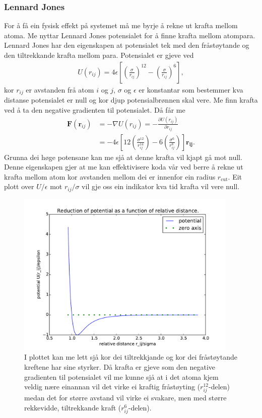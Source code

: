 \documentclass[12pt, a4paper]{article}
\theoremstyle{definition} \newtheorem*{definition}{Teorem}
\newcommand{\vb}{\mathbf}
\begin{document}
        \subsubsection*{Lennard Jones}
            For å få ein fysisk effekt på systemet må me byrje å rekne ut krafta mellom atoma. Me nyttar Lennard Jones potensialet for å finne krafta mellom atompara.
            Lennard Jones har den eigenskapen at potensialet tek med den fråstøytande og den tiltrekkande krafta mellom para. Potensialet er gjeve ved
            \begin{align*}
                U(r_{ij}) = 4\epsilon\left[ \left( \frac{\sigma}{r_{ij}} \right)^{12} - \left( \frac{\sigma}{r_{ij}} \right)^{6} \right],
            \end{align*}
            kor $r_{ij}$ er avstanden frå atom $i$ og $j$, $\sigma$ og $\epsilon$ er konstantar som bestemmer kva distanse potensialet er null og kor djup potensialbrønnen skal vere.
            Me finn krafta ved å ta den negative gradienten til potensialet. Då får me
            \begin{align*}
                \vb{F}(\vb{r}_{ij}) &= -\nabla U(r_{ij}) = -\frac{\partial U(r_{ij})}{\partial r_{ij}} \\
                &= -4\epsilon\left[ 12\left( \frac{\sigma^{12}}{r_{ij}^{14}} \right) - 6\left( \frac{\sigma^6}{r_{ij}^8} \right) \right]\vb{r_{ij}}.
            \end{align*}
            Grunna dei høge potensane kan me sjå at denne krafta vil kjapt gå mot null. Denne eigenskapen gjer at me kan effektivisere koda vår ved berre å rekne ut krafta 
            mellom atom kor avstanden mellom dei er innenfor ein radius $r_{\text{cut}}$.
            Eit plott over $U/\epsilon$ mot $r_{ij}/\sigma$ vil gje oss ein indikator kva tid krafta vil vere null.
            \begin{figure}[H]
                \centering
                \includegraphics[width=400px]{potentialPlot.pdf}
                \caption{I plottet kan me lett sjå kor dei tiltrekkjande og kor dei fråstøytande kreftene har sine styrker. Då krafta er gjeve som den negative gradienten til
                        potensialet vil me kunne sjå at i det atoma kjem veldig nære einannan vil det virke ei kraftig fråstøyting ($r_{ij}^{12}$-delen) medan det for større avstand
                        vil virke ei svakare, men med større rekkevidde, tiltrekkande kraft ($r_{ij}^6$-delen).}
            \end{figure}
\end{document}
